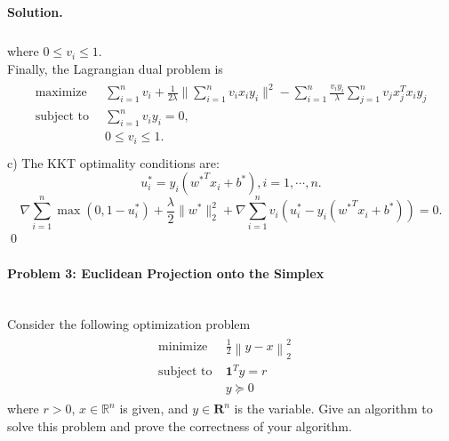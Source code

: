 \documentclass[a4paper]{article}
\newenvironment{solution}
{\color{blue} \paragraph{Solution.\\}}
{\newline \qed}
\begin{document}
\begin{solution}
\begin{equation}
\begin{aligned}
\end{aligned}
\end{equation}
where $0 \leq v_i \leq 1.$\\
Finally, the Lagrangian dual problem is
\begin{gather*}
\begin{matrix}
\text{maximize~~} &\sum_{i=1}^nv_i+\frac{1}{2\lambda}\|\sum_{i=1}^nv_ix_iy_i\|^2-\sum_{i=1}^n\frac{v_iy_i}{\lambda}\sum_{j=1}^nv_jx_j^Tx_iy_j\\
\text{subject to} &\sum_{i=1}^nv_iy_i=0,\\&0 \leq v_i \leq 1.~~\\
\end{matrix}
\end{gather*}
\quad c) The KKT optimality conditions are:
$$u_i^*=y_i({w^*}^Tx_i+b^*),i=1,\cdots,n.$$
$$\nabla\sum_{i=1}^n\max\left(0,1-u_i^*\right)+\frac{\lambda}{2}\|w^*\|_2^2+\nabla\sum_{i=1}^nv_i(u_i^*-y_i({w^*}^Tx_i+b^*))=0.$$
\end{solution}

\paragraph{Problem 3: Euclidean Projection onto the Simplex}
~\\
Consider the following optimization problem
\begin{gather*}
\begin{matrix}
\text{minimize~~} & \frac{1}{2}\left\|y-x\right\|^2_2\quad\\
\text{subject to} & \mathbf{1}^Ty=r\quad\quad\\
&y\succeq0\quad\quad\quad
\end{matrix}
\end{gather*}
where $r>0$, $x\in \mathbb{R}^n$ is given, and $y\in \mathbf{R}^n$ is the variable. Give an algorithm to solve this problem and prove the correctness of your algorithm.
\end{document}
